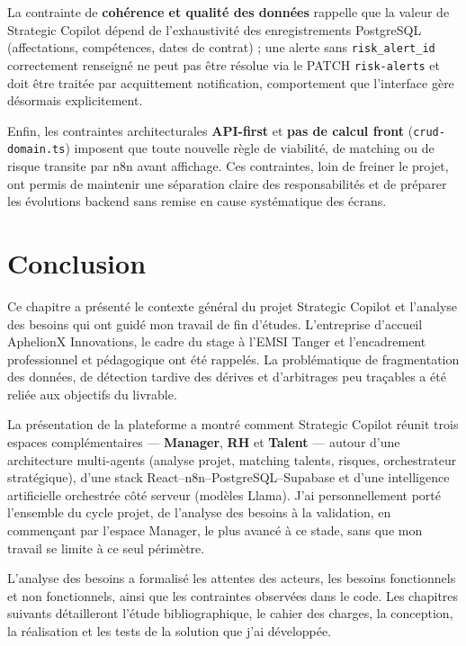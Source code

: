 La contrainte de \textbf{cohérence et qualité des données} rappelle que la valeur de Strategic Copilot dépend de l'exhaustivité des enregistrements PostgreSQL (affectations, compétences, dates de contrat) ; une alerte sans \texttt{risk\_alert\_id} correctement renseigné ne peut pas être résolue via le PATCH \texttt{risk-alerts} et doit être traitée par acquittement notification, comportement que l'interface gère désormais explicitement.

Enfin, les contraintes architecturales \textbf{API-first} et \textbf{pas de calcul front} (\texttt{crud-domain.ts}) imposent que toute nouvelle règle de viabilité, de matching ou de risque transite par n8n avant affichage. Ces contraintes, loin de freiner le projet, ont permis de maintenir une séparation claire des responsabilités et de préparer les évolutions backend sans remise en cause systématique des écrans.

\section{Conclusion}

Ce chapitre a présenté le contexte général du projet Strategic Copilot et l'analyse des besoins qui ont guidé mon travail de fin d'études. L'entreprise d'accueil AphelionX Innovations, le cadre du stage à l'EMSI Tanger et l'encadrement professionnel et pédagogique ont été rappelés. La problématique de fragmentation des données, de détection tardive des dérives et d'arbitrages peu traçables a été reliée aux objectifs du livrable.

La présentation de la plateforme a montré comment Strategic Copilot réunit trois espaces complémentaires --- \textbf{Manager}, \textbf{RH} et \textbf{Talent} --- autour d'une architecture multi-agents (analyse projet, matching talents, risques, orchestrateur stratégique), d'une stack React--n8n--PostgreSQL--Supabase et d'une intelligence artificielle orchestrée côté serveur (modèles Llama). J'ai personnellement porté l'ensemble du cycle projet, de l'analyse des besoins à la validation, en commençant par l'espace Manager, le plus avancé à ce stade, sans que mon travail se limite à ce seul périmètre.

L'analyse des besoins a formalisé les attentes des acteurs, les besoins fonctionnels et non fonctionnels, ainsi que les contraintes observées dans le code. Les chapitres suivants détailleront l'étude bibliographique, le cahier des charges, la conception, la réalisation et les tests de la solution que j'ai développée.
